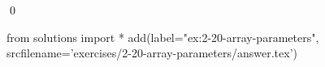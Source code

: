 
\begin{ex}
  \label{ex:2-20-array-parameters}
  
  \qed
\end{ex}
\begin{python0}
from solutions import *
add(label="ex:2-20-array-parameters",
    srcfilename='exercises/2-20-array-parameters/answer.tex')
\end{python0}
